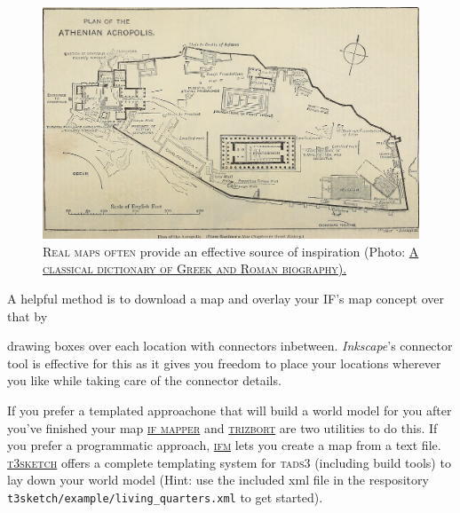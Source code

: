 \begin{figure}[h]                                                           
 \includegraphics[width=\linewidth]{./media/images/acropolis_map}%
  \small{\textsc{\\ Real maps often} provide an effective source of inspiration (Photo:
    \href{https://commons.wikimedia.org/wiki/File:Plan_of_the_Athenian_Acropolis.jpg}{\textsc{A classical dictionary of Greek and Roman biography).}}}
  \label{fig:planning}%
\end{figure}
A helpful method is to download a map and overlay your IF's map concept over that by

\reversemarginpar
{}
drawing boxes over each location with connectors in\textendash between.
\textit{Inkscape}'s connector tool is effective for this as it gives you freedom
to place your locations wherever you like while taking care of the connector
details.


If you prefer a templated approach\textemdash one that will build a world model
for you after you've finished your map\textemdash
\href{http://ggarra13.github.io/ifmapper/en/}{\textsc{if mapper}} and
\href{https://trizbort.genstein.net/#overview}{\textsc{trizbort}} are two utilities to do
this. If you prefer a programmatic approach,
\href{https://ifm.readthedocs.io/en/latest/}{\textsc{ifm}} lets you create a map from a
text file. \href{https://github.com/dustinlacewell/t3sketch}{\textsc{t3sketch}} offers a
complete templating system for \textsc{tads3} (including build tools) to lay
down your world model (Hint: use the included xml file in the respository
\texttt{\tiny{t3sketch/example/living\_quarters.xml}} to get started).


